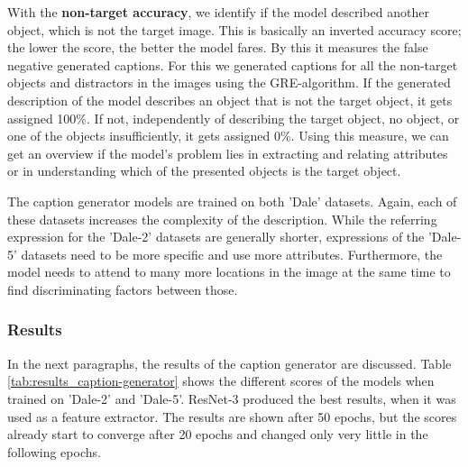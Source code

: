 With the \textbf{non-target accuracy}, we identify if the model described another object, which is not the target image.
This is basically an inverted accuracy score; the lower the score, the better the model fares.
By this it measures the false negative generated captions.
For this we generated captions for all the non-target objects and distractors in the images using the GRE-algorithm.
If the generated description of the model describes an object that is not the target object, it gets assigned 100\%.
If not, independently of describing the target object, no object, or one of the objects insufficiently, it gets assigned 0\%.
Using this measure, we can get an overview if the model's problem lies in extracting and relating attributes or in understanding which of the presented objects is the target object.

The caption generator models are trained on both 'Dale' datasets.
Again, each of these datasets increases the complexity of the description.
While the referring expression for the 'Dale-2' datasets are generally shorter, expressions of the 'Dale-5' datasets need to be more specific and use more attributes.
Furthermore, the model needs to attend to many more locations in the image at the same time to find discriminating factors between those.

\subsubsection*{Results}
In the next paragraphs, the results of the caption generator are discussed.
Table \ref{tab:results_caption-generator} shows the different scores of the models when trained on 'Dale-2' and 'Dale-5'.
ResNet-3 produced the best results, when it was used as a feature extractor.
The results are shown after 50 epochs, but the scores already start to converge after 20 epochs and changed only very little in the following epochs.

